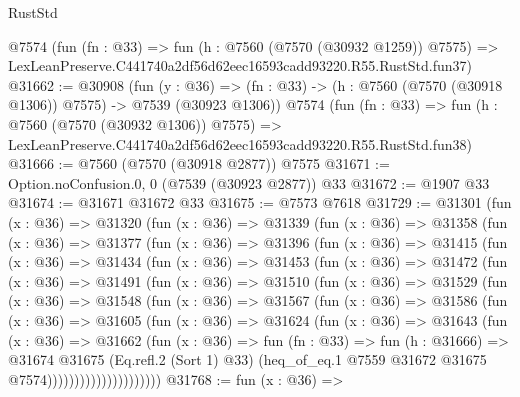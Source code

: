 \begin{lexlean}{RustStd}
\begin{coremodule}
    @7574
    (fun (fn : @33) =>
    fun (h : @7560 (@7570 (@30932 @1259)) @7575) =>
    LexLeanPreserve.C441740a2df56d62eec16593cadd93220.R55.RustStd.fun37)
@31662 := @30908
    (fun (y : @36) =>
    (fn : @33) -> (h : @7560 (@7570 (@30918 @1306)) @7575) -> @7539 (@30923 @1306))
    @7574
    (fun (fn : @33) =>
    fun (h : @7560 (@7570 (@30932 @1306)) @7575) =>
    LexLeanPreserve.C441740a2df56d62eec16593cadd93220.R55.RustStd.fun38)
@31666 := @7560 (@7570 (@30918 @2877)) @7575
@31671 := Option.noConfusion.{0, 0} (@7539 (@30923 @2877)) @33
@31672 := @1907 @33
@31674 := @31671 @31672 @33
@31675 := @7573 @7618
@31729 := @31301
    (fun (x : @36) =>
    @31320
      (fun (x : @36) =>
      @31339
        (fun (x : @36) =>
        @31358
          (fun (x : @36) =>
          @31377
            (fun (x : @36) =>
            @31396
              (fun (x : @36) =>
              @31415
                (fun (x : @36) =>
                @31434
                  (fun (x : @36) =>
                  @31453
                    (fun (x : @36) =>
                    @31472
                      (fun (x : @36) =>
                      @31491
                        (fun (x : @36) =>
                        @31510
                          (fun (x : @36) =>
                          @31529
                            (fun (x : @36) =>
                            @31548
                              (fun (x : @36) =>
                              @31567
                                (fun (x : @36) =>
                                @31586
                                  (fun (x : @36) =>
                                  @31605
                                    (fun (x : @36) =>
                                    @31624
                                      (fun (x : @36) =>
                                      @31643
                                        (fun (x : @36) =>
                                        @31662
                                          (fun (x : @36) =>
                                          fun (fn : @33) =>
                                          fun (h : @31666) =>
                                          @31674
                                            @31675
                                            (Eq.refl.{2} (Sort 1) @33)
                                            (heq_of_eq.{1}
                                              @7559
                                              @31672
                                              @31675
                                              @7574)))))))))))))))))))))
@31768 := fun (x : @36) =>

\end{coremodule}
\end{lexlean}
